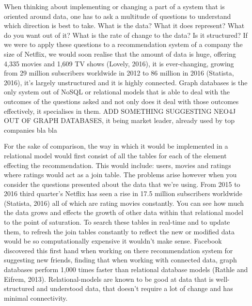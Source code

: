 \documentclass[a4paper]{article}
\begin{document}
When thinking about implementing or changing a part of a system that is oriented around data, one has to ask a multitude of questions to understand which direction is best to take. What is the data? What it does represent? What do you want out of it? What is the rate of change to the data? Is it structured? If we were to apply these questions to a recommendation system of a company the size of Netflix, we would soon realise that the amount of data is huge, offering 4,335 movies and 1,609 TV shows (Lovely, 2016), it is ever-changing, growing from 29 million subscribers worldwide in 2012 to 86 million in 2016 (Statista, 2016), it's largely unstructured and it is highly connected. Graph databases is the only system out of NoSQL or relational models that is able to deal with the outcomes of the questions asked and not only does it deal with those outcomes effectively, it specialises in them. ADD SOMETHING SUGGESTING NEO4J OUT OF GRAPH DATABASES, it being market leader, already used by top companies bla bla\par

For the sake of comparison, the way in which it would be implemented in a relational model would first consist of all the tables for each of the element effecting the recommendation. This would include: users, movies and ratings where ratings would act as a join table. The problems arise however when you consider the questions presented about the data that we're using. From 2015 to 2016 third quarter's Netflix has seen a rise in 17.5 million subscribers worldwide (Statista, 2016) all of which are rating movies constantly. You can see how much the data grows and effects the growth of other data within that relational model to the point of saturation. To search these tables in real-time and to update them, to refresh the join tables constantly to reflect the new or modified data would be so computationally expensive it wouldn't make sense. Facebook discovered this first hand when working on there recommendation system for suggesting new friends, finding that when working with connected data, graph databases perform 1,000 times faster than relational database models (Rathle and Eifrem, 2013). Relational-models are known to be good at data that is well-structured and understood data, that doesn't require a lot of change and has minimal connectivity.
\end{document}
